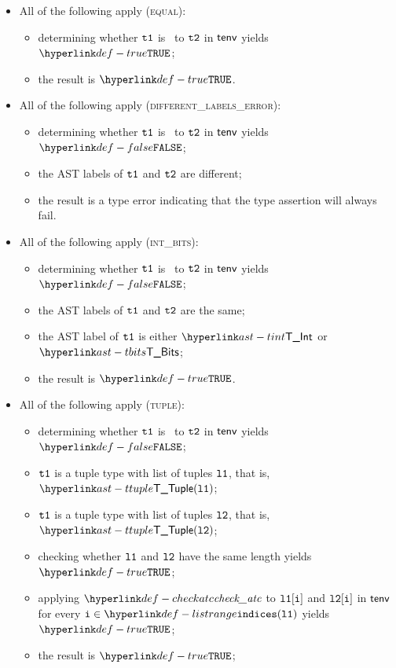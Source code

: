 \begin{itemize}
  \item All of the following apply (\textsc{equal}):
  \begin{itemize}
    \item determining whether $\texttt{t1}$ is \typeequivalent\ to $\texttt{t2}$ in $\textsf{tenv}$ yields $\True$\ProseOrTypeError;
    \item the result is $\True$.
  \end{itemize}

  \item All of the following apply (\textsc{different\_labels\_error}):
  \begin{itemize}
    \item determining whether $\texttt{t1}$ is \typeequivalent\ to $\texttt{t2}$ in $\textsf{tenv}$ yields $\False$;
    \item the AST labels of $\texttt{t1}$ and $\texttt{t2}$ are different;
    \item the result is a type error indicating that the type assertion will always fail.
  \end{itemize}

  \item All of the following apply (\textsc{int\_bits}):
  \begin{itemize}
    \item determining whether $\texttt{t1}$ is \typeequivalent\ to $\texttt{t2}$ in $\textsf{tenv}$ yields $\False$;
    \item the AST labels of $\texttt{t1}$ and $\texttt{t2}$ are the same;
    \item the AST label of $\texttt{t1}$ is either $\TInt$ or $\TBits$;
    \item the result is $\True$.
  \end{itemize}

  \item All of the following apply (\textsc{tuple}):
  \begin{itemize}
    \item determining whether $\texttt{t1}$ is \typeequivalent\ to $\texttt{t2}$ in $\textsf{tenv}$ yields $\False$;
    \item $\texttt{t1}$ is a tuple type with list of tuples $\texttt{l1}$, that is, $\TTuple(\vlone)$;
    \item $\texttt{t1}$ is a tuple type with list of tuples $\texttt{l2}$, that is, $\TTuple(\vltwo)$;
    \item checking whether $\texttt{l1}$ and $\texttt{l2}$ have the same length yields $\True$\ProseTerminateAs{\TypeErrorVal{\TypeAsssertionFails}};
    \item applying $\checkatc$ to $\texttt{l1}[\texttt{i}]$ and $\texttt{l2}[\texttt{i}]$ in $\textsf{tenv}$ for every $\vi\in\listrange(\vlone)$ yields $\True$\ProseOrTypeError;
    \item the result is $\True$;
  \end{itemize}


\end{itemize}
